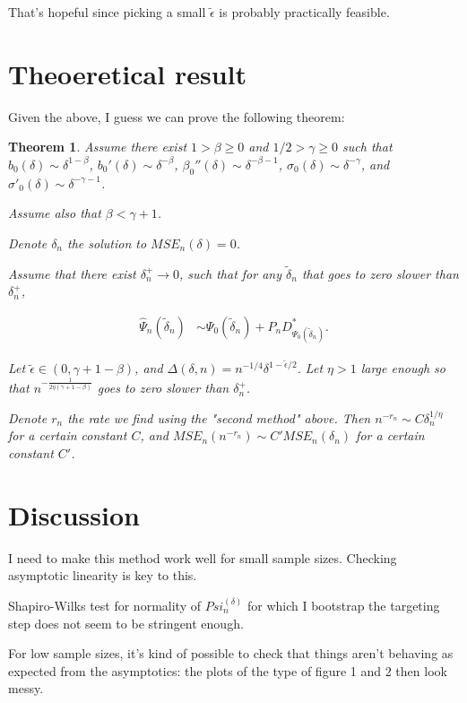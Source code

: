 \documentclass[a4paper]{article}
\newtheorem{thm}{Theorem}
\begin{document}
\medskip

That's hopeful since picking a small $\tilde{\epsilon}$ is probably practically feasible.

\medskip

\section{Theoeretical result}

Given the above, I guess we can prove the following theorem:

\begin{thm}
Assume there exist $1 > \beta \geq 0$ and $1/2 > \gamma \geq 0$ such that $b_0(\delta) \sim \delta^{1 - \beta}$, $b_0'(\delta) \sim \delta^{-\beta}$, $\beta_0''(\delta) \sim \delta^{-\beta - 1}$, $\sigma_0(\delta) \sim \delta^{-\gamma}$, 
and $\sigma'_0(\delta) \sim \delta^{-\gamma - 1}$. 

Assume also that $\beta < \gamma + 1$.


Denote $\delta_n$ the solution to $MSE_n(\delta) = 0$.


Assume that there exist $\delta_n^+ \rightarrow 0$, such that for any $\tilde{\delta}_n$ that goes to zero slower than $\delta_n^+$, 

\begin{align*}
\hat{\Psi}_n(\tilde{\delta}_n) &\sim \Psi_0(\tilde{\delta}_n) + P_n D^*_{\Psi_0(\tilde{\delta}_n)}.
\end{align*}

Let $\tilde{\epsilon} \in (0, \gamma + 1 - \beta)$, and $\Delta(\delta, n) = n^{-1/4} \delta^{1 - \tilde{\epsilon} / 2}$. Let $\eta > 1$ large enough so that $n^{-\frac{1}{2 \eta (\gamma + 1 - \beta)}}$ goes to zero slower than $\delta_n^+$.

Denote $r_n$ the rate we find using the "second method" above. Then $n^{-r_n} \sim C \delta_n^{1 / \eta}$ for a certain constant $C$, and $MSE_n(n^{-r_n}) \sim C' MSE_n(\delta_n)$ for a certain constant $C'$.

\end{thm}

\section{Discussion}

I need to make this method work well for small sample sizes. Checking asymptotic linearity is key to this.

Shapiro-Wilks test for normality of $Psi_n^(\delta)$ for which I bootstrap the targeting step does not seem to be stringent enough.

For low sample sizes, it's kind of possible to check that things aren't behaving as expected from the asymptotics: the plots of the type of figure 1 and 2 then look messy.
\end{document}

